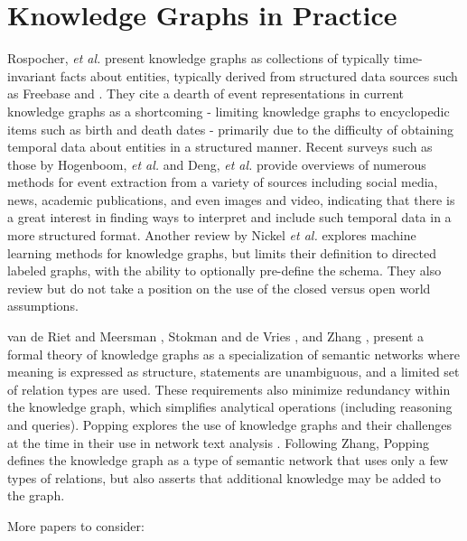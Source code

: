 \section{Knowledge Graphs in Practice}
Rospocher, \textit{et al.} present knowledge graphs as collections of typically time-invariant facts about entities, typically derived from structured data sources such as Freebase and \cite{Rospocher2016}. They cite a dearth of event representations in current knowledge graphs as a shortcoming - limiting knowledge graphs to encyclopedic items such as birth and death dates - primarily due to the difficulty of obtaining temporal data about entities in a structured manner. Recent surveys such as those by Hogenboom, \textit{et al.} \cite{Hogenboom2016} and Deng, \textit{et al.} \cite{Deng2015} provide overviews of numerous methods for event extraction from a variety of sources including social media, news, academic publications, and even images and video, indicating that there is a great interest in finding ways to interpret and include such temporal data in a more structured format.
Another review by Nickel \emph{et al.} explores machine learning methods for knowledge graphs, but limits their definition to directed labeled graphs, with the ability to optionally pre-define the schema.
They also review but do not take a position on the use of the closed versus open world assumptions.

van de Riet and Meersman \cite{van1992knowledge}, Stokman and de Vries \cite{Stokman_1988}, and Zhang \cite{zhang2002knowledge}, present a formal theory of knowledge graphs as a specialization of semantic networks where meaning is expressed as structure, statements are unambiguous, and a limited set of relation types are used.
These requirements also minimize redundancy within the knowledge graph, which simplifies analytical operations (including reasoning and queries).
Popping explores the use of knowledge graphs and their challenges at the time in their use in network text analysis \cite{Popping_2003}. 
Following Zhang, Popping defines the knowledge graph as a type of semantic network that uses only a few types of relations, but also asserts that additional knowledge may be added to the graph.

More papers to consider: \cite{Dieng_1992} \cite{Juel_Vang_2013}

